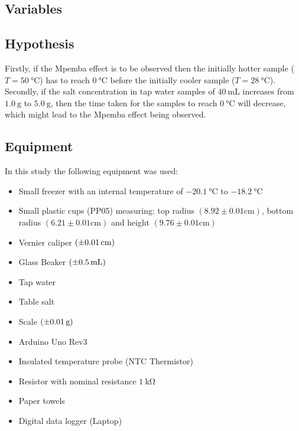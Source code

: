 \documentclass[../main.tex]{subfiles}
\begin{document}
\doublespacing



\subsection{Variables}


\subsection{Hypothesis}
Firstly, if the Mpemba effect is to be observed then the initially hotter sample ($T = \SI{50}{\celsius}$) has to reach $\SI{0}{\celsius}$ before the initially cooler sample ($T = \SI{28}{\celsius}$). Secondly, if the salt concentration in tap water samples of $\SI{40}{\milli\liter}$ increases from $\SI{1.0}{\gram}$ to $\SI{5.0}{\gram}$, then the time taken for the samples to reach $\SI{0}{\celsius}$ will decrease, which might lead to the Mpemba effect being observed. \par

\subsection{Equipment}
In this study the following equipment was used:
\begin{singlespacing}
\begin{itemize}
    \item Small freezer with an internal temperature of $\SI{-20.1}{\celsius}$ to $\SI{-18.2}{\celsius}$
    \item Small plastic cups (PP05) measuring: top radius $(8.92 \pm 0.01 \si{\centi\meter})$, bottom radius $(6.21 \pm 0.01 \si{\centi\meter})$ and height $(9.76 \pm 0.01\si{\centi\meter})$
    \item Vernier caliper $(\SI{\pm 0.01}{\centi\meter})$
    \item Glass Beaker $(\SI{\pm 0.5}{\milli\liter})$
    \item Tap water
    \item Table salt
    \item Scale $(\SI{\pm 0.01}{\gram})$
    \item Arduino Uno Rev3 \autocite{arduino}
    \item Insulated temperature probe (NTC Thermistor) 
    \item Resistor with nominal resistance $\SI{1}{\kilo\ohm}$
    \item Paper towels
    \item Digital data logger (Laptop)
\end{itemize}
\end{singlespacing}
\end{document}
